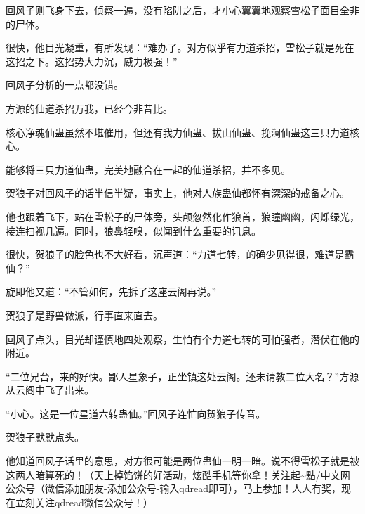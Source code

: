 \begin{this_body}
回风子则飞身下去，侦察一遍，没有陷阱之后，才小心翼翼地观察雪松子面目全非的尸体。

很快，他目光凝重，有所发现：“难办了。对方似乎有力道杀招，雪松子就是死在这招之下。这招势大力沉，威力极强！”

回风子分析的一点都没错。

方源的仙道杀招万我，已经今非昔比。

核心净魂仙蛊虽然不堪催用，但还有我力仙蛊、拔山仙蛊、挽澜仙蛊这三只力道核心。

能够将三只力道仙蛊，完美地融合在一起的仙道杀招，并不多见。

贺狼子对回风子的话半信半疑，事实上，他对人族蛊仙都怀有深深的戒备之心。

他也跟着飞下，站在雪松子的尸体旁，头颅忽然化作狼首，狼瞳幽幽，闪烁绿光，接连扫视几遍。同时，狼鼻轻嗅，似闻到什么重要的讯息。

很快，贺狼子的脸色也不大好看，沉声道：“力道七转，的确少见得很，难道是霸仙？”

旋即他又道：“不管如何，先拆了这座云阁再说。”

贺狼子是野兽做派，行事直来直去。

回风子点头，目光却谨慎地四处观察，生怕有个力道七转的可怕强者，潜伏在他的附近。

“二位兄台，来的好快。鄙人星象子，正坐镇这处云阁。还未请教二位大名？”方源从云阁中飞了出来。

“小心。这是一位星道六转蛊仙。”回风子连忙向贺狼子传音。

贺狼子默默点头。

他知道回风子话里的意思，对方很可能是两位蛊仙一明一暗。说不得雪松子就是被这两人暗算死的！（天上掉馅饼的好活动，炫酷手机等你拿！关注起\~{}點/中文网公众号（微信添加朋友-添加公众号-输入qdread即可），马上参加！人人有奖，现在立刻关注qdread微信公众号！）

\end{this_body}

